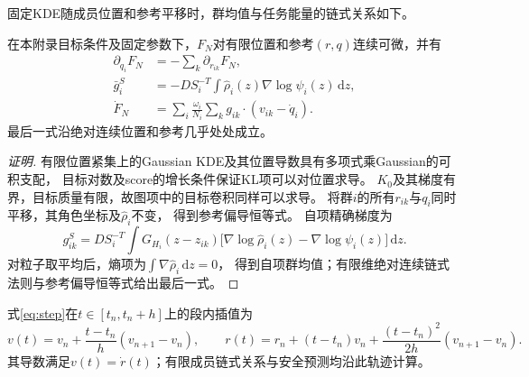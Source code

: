 \documentclass[UTF8,a4paper,11pt,fontset=none]{ctexart}
\begin{document}
固定KDE随成员位置和参考平移时，群均值与任务能量的链式关系如下。
\begin{lemma}[固定目标与KDE的参考平移]\label{lem:kde-chain}
在本附录目标条件及固定参数下，$F_N$对有限位置和参考$(r,q)$连续可微，并有
\begin{align*}
\partial_{q_i}F_N&=-\sum_k\partial_{r_{ik}}F_N,\\
\bar g_i^S&=-D S_i^{-T}\int\widehat\rho_i(z)\nabla\log\psi_i(z)\,\mathrm dz,\\
\dot F_N&=\sum_i\frac{\omega_i}{N_i}\sum_k g_{ik}\cdot(v_{ik}-\dot q_i).
\end{align*}
最后一式沿绝对连续位置和参考几乎处处成立。
\end{lemma}
\begin{proof}[证明]
有限位置紧集上的Gaussian KDE及其位置导数具有多项式乘Gaussian的可积支配，
目标对数及score的增长条件保证KL项可以对位置求导。
$K_0$及其梯度有界，目标质量有限，故图项中的目标卷积同样可以求导。
将群$i$的所有$r_{ik}$与$q_i$同时平移，其角色坐标及$\widehat\rho_i$不变，
得到参考偏导恒等式。
自项精确梯度为
\[
g^S_{ik}=D S_i^{-T}\int G_{H_i}(z-z_{ik})
\big[\nabla\log\widehat\rho_i(z)-\nabla\log\psi_i(z)\big]\,\mathrm dz.
\]
对粒子取平均后，熵项为$\int\nabla\widehat\rho_i\,\mathrm dz=0$，
得到自项群均值；有限维绝对连续链式法则与参考偏导恒等式给出最后一式。
\end{proof}
式\eqref{eq:step}在$t\in[t_n,t_n+h]$上的段内插值为
\[
v(t)=v_n+\frac{t-t_n}{h}(v_{n+1}-v_n),\qquad
r(t)=r_n+(t-t_n)v_n+\frac{(t-t_n)^2}{2h}(v_{n+1}-v_n).
\]
其导数满足$v(t)=\dot r(t)$；有限成员链式关系与安全预测均沿此轨迹计算。
\end{document}
